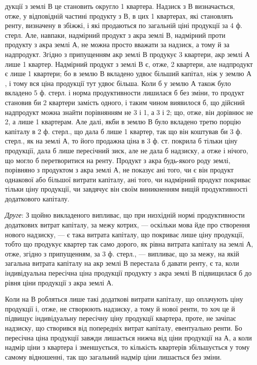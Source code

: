 \parcont{}  %
дукції з землі $В$ це становить округло 1 квартера. Надзиск з $В$ визначається,
отже, у відповідній частині продукту з $В$, в цих 1 квартерах, які
становлять ренту, визначену в збіжжі, і які продаються по загальній ціні продукції
за 4 ф. стерл. Але, навпаки, надмірний продукт з акра землі $В$, надмірний
проти продукту з акра землі $А$, не можна просто вважати за надзиск,
а тому й за надпродукт. Згідно з припущенням акр землі $В$ продукує 3 квартери,
акр землі $А$ лише 1 квартер. Надмірний продукт з землі $В$ є, отже,
2 квартери, але надпродукт є лише 1 квартери; бо в землю
$В$ вкладено удвоє більший капітал, ніж у землю $А$, і тому вся ціна продукції тут удвоє
більша. Коли б у землю $А$ також було вкладено 5 ф. стерл. і норма продуктивности
лишилася б без зміни, то продукт становив би 2 квартери замість одного,
і таким чином виявилося б, що дійсний надпродукт можна знайти порівнянням
не 3 і 1, а 3 і 2; що, отже, він дорівнює не 2,
а лише 1 квартерам.
Але далі, якби в землю $В$ було вкладено третю порцію капіталу в 2 ф. стерл.,
що дала б лише 1 квартер, так що він коштував би 3 ф. стерл., як на землі $А$, то
його продажна ціна в 3 ф. ст. покрила б тільки ціну продукції, дала б лише
пересічний зиск, але не дала б надзиску, а отже і нічого, що могло б перетворитися
на ренту. Продукт з акра будь-якого роду землі, порівняно з продуктом
з акра землі $А$, не показує ані того, чи є він продукт однакової або більшої
витрати капіталу, ані того, чи надмірний продукт покриває тільки ціну продукції,
чи завдячує він своїм виникненням вищій продуктивності додаткового капіталу.

\emph{Друге}: З щойно викладеного випливає, що при низхідній нормі продуктивности
додаткових витрат капіталу, за межу котрих, — оскільки мова йде
про створення нового надзиску, — є така витрата капіталу, що покриває лише
ціну продукції, тобто що продукує квартер так само дорого, як рівна витрата
капіталу на землі $А$, отже, згідно з припущенням, за 3 ф. стерл., — випливає,
що за межу, на якій загальна витрата капіталу на акр землі $В$ перестала б
давати ренту, є та, коли індивідуальна пересічна ціна продукції продукту з
акра землі $В$ підвищилася б до рівня ціни продукції з акра землі $А$.

Коли на $В$ робляться лише такі додаткові витрати капіталу, що оплачують
ціну продукції і, отже, не створюють надзиску, а тому й нової ренти, то хоч
це й підвищує індивідуальну пересічну ціну продукції квартера, проте, не зачіпає
надзиску, що створився від попередніх витрат капіталу, евентуально ренти. Бо
пересічна ціна продукції завжди лишається нижча від ціни продукції на $А$, а коли
надмір ціни з квартера і зменшується, то кількість квартерів збільшується
у тому самому відношенні, так що загальний надмір ціни лишається без зміни.

